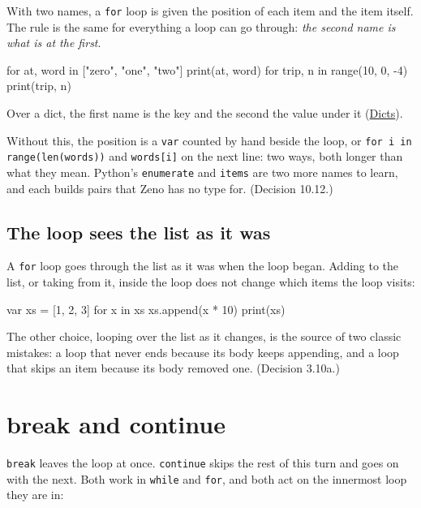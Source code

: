With two names, a \verb|for| loop is given the position of each item
and the item itself. The rule is the same for everything a loop can go
through: \emph{the second name is what is at the first}.

\begin{zeno}
for at, word in ["zero", "one", "two"] {
    print(at, word)
}
for trip, n in range(10, 0, -4) {
    print(trip, n)
}
\end{zeno}

Over a dict, the first name is the key and the second the value under
it (\hyperref[ch-dicts]{Dicts}).

\begin{why}
Without this, the position is a \verb|var| counted by hand beside the
loop, or \verb|for i in range(len(words))| and \verb|words[i]| on the
next line: two ways, both longer than what they mean. Python's
\verb|enumerate| and \verb|items| are two more names to learn, and
each builds pairs that Zeno has no type for. (Decision 10.12.)
\end{why}

\subsection{The loop sees the list as it was}

A \verb|for| loop goes through the list as it was when the loop began.
Adding to the list, or taking from it, inside the loop does not change
which items the loop visits:

\begin{zeno}
var xs = [1, 2, 3]
for x in xs {
    xs.append(x * 10)
}
print(xs)
\end{zeno}

\begin{why}
The other choice, looping over the list as it changes, is the source
of two classic mistakes: a loop that never ends because its body keeps
appending, and a loop that skips an item because its body removed one.
(Decision 3.10a.)
\end{why}

\section{break and continue}

\verb|break| leaves the loop at once. \verb|continue| skips the rest of
this turn and goes on with the next. Both work in \verb|while| and
\verb|for|, and both act on the innermost loop they are in:

